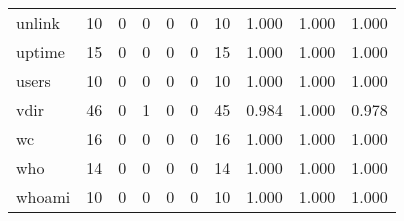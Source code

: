 \begin{longtable}{lp{1.3cm}p{1.3cm}p{1.3cm}p{1.3cm}p{1.3cm}p{1.3cm}p{1.3cm}p{1.3cm}p{1.3cm}}
unlink    &                     10 &                                             0 &                                            0 &                                           0 &                                            0 &                                         10 &                                1.000 &                                  1.000 &                                1.000 \\
uptime    &                     15 &                                             0 &                                            0 &                                           0 &                                            0 &                                         15 &                                1.000 &                                  1.000 &                                1.000 \\
users     &                     10 &                                             0 &                                            0 &                                           0 &                                            0 &                                         10 &                                1.000 &                                  1.000 &                                1.000 \\
vdir      &                     46 &                                             0 &                                            1 &                                           0 &                                            0 &                                         45 &                                0.984 &                                  1.000 &                                0.978 \\
wc        &                     16 &                                             0 &                                            0 &                                           0 &                                            0 &                                         16 &                                1.000 &                                  1.000 &                                1.000 \\
who       &                     14 &                                             0 &                                            0 &                                           0 &                                            0 &                                         14 &                                1.000 &                                  1.000 &                                1.000 \\
whoami    &                     10 &                                             0 &                                            0 &                                           0 &                                            0 &                                         10 &                                1.000 &                                  1.000 &                                1.000 \\

\end{longtable}
